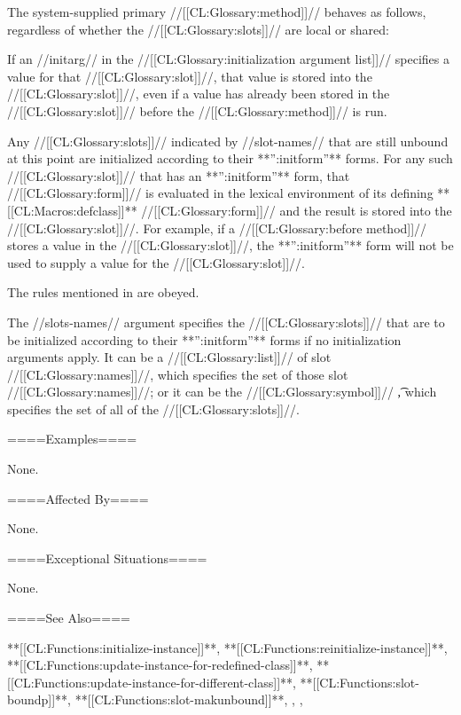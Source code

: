 The system-supplied primary //[[CL:Glossary:method]]// behaves as follows, regardless of whether the //[[CL:Glossary:slots]]// are local or shared:

\beginlist

\itemitem{\bull} If an //initarg// in the //[[CL:Glossary:initialization argument list]]// specifies a value for that //[[CL:Glossary:slot]]//, that value is stored into the //[[CL:Glossary:slot]]//, even if a value has already been stored in the //[[CL:Glossary:slot]]// before the //[[CL:Glossary:method]]// is run.

\itemitem{\bull} Any //[[CL:Glossary:slots]]// indicated by //slot-names// that are still unbound at this point are initialized according to their **'':initform''** forms. For any such //[[CL:Glossary:slot]]// that has an **'':initform''** form, that //[[CL:Glossary:form]]// is evaluated in the lexical environment of its defining **[[CL:Macros:defclass]]** //[[CL:Glossary:form]]// and the result is stored into the //[[CL:Glossary:slot]]//. For example, if a //[[CL:Glossary:before method]]// stores a value in the //[[CL:Glossary:slot]]//, the **'':initform''** form will not be used to supply a value for the //[[CL:Glossary:slot]]//.

\itemitem{\bull} The rules mentioned in {\secref\InitargRules} are obeyed.

\endlist

The //slots-names// argument specifies the //[[CL:Glossary:slots]]// that are to be initialized according to their **'':initform''** forms if no initialization arguments apply. It can be a //[[CL:Glossary:list]]// of slot //[[CL:Glossary:names]]//, which specifies the set of those slot //[[CL:Glossary:names]]//; or it can be the //[[CL:Glossary:symbol]]// \t, which specifies the set of all of the //[[CL:Glossary:slots]]//.


====Examples====

None.

====Affected By====

None.

====Exceptional Situations====

None.


====See Also====

**[[CL:Functions:initialize-instance]]**, **[[CL:Functions:reinitialize-instance]]**, **[[CL:Functions:update-instance-for-redefined-class]]**, **[[CL:Functions:update-instance-for-different-class]]**, **[[CL:Functions:slot-boundp]]**, **[[CL:Functions:slot-makunbound]]**, {\secref\ObjectCreationAndInit}, {\secref\InitargRules}, {\secref\DeclaringInitargValidity}


